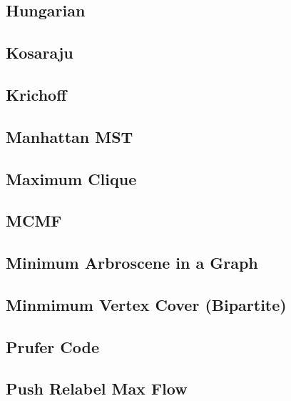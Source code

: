 \subsection{Hungarian}
\raggedbottom
\hrulefill
\subsection{Kosaraju}
\raggedbottom
\hrulefill
\subsection{Krichoff}
\raggedbottom
\hrulefill
\subsection{Manhattan MST}
\raggedbottom
\hrulefill
\subsection{Maximum Clique}
\raggedbottom
\hrulefill
\subsection{MCMF}
\raggedbottom
\hrulefill
\subsection{Minimum Arbroscene in a Graph}
\raggedbottom
\hrulefill
\subsection{Minmimum Vertex Cover (Bipartite)}
\raggedbottom
\hrulefill
\subsection{Prufer Code}
\raggedbottom
\hrulefill
\subsection{Push Relabel Max Flow}
\raggedbottom
\hrulefill
